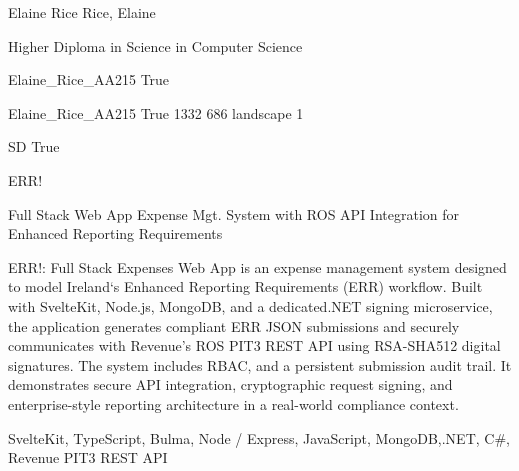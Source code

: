 \documentclass[twoside]{report}
\begin{document}
\begingroup{}\relax



\def\Key{Elaine_Rice_AA215}

{Elaine Rice}
{Rice, Elaine}

{Higher Diploma in Science in Computer Science}

{Elaine_Rice_AA215}
{True}

{Elaine_Rice_AA215}
{True}
{1332}
{686}
{landscape}
{1}

{SD}
{True}

{ERR!}

{Full Stack Web App Expense Mgt. System with ROS API Integration for Enhanced Reporting Requirements}

{ERR!: Full Stack Expenses Web App is an expense management system designed to model Ireland\textquoteleft{}s Enhanced Reporting Requirements (ERR) workflow. Built with SvelteKit, Node.js, MongoDB, and a dedicated.NET signing microservice, the application generates compliant ERR JSON submissions and securely communicates with Revenue\textquoteright{}s ROS PIT3 REST API using RSA-SHA512 digital signatures. The system includes RBAC, and a persistent submission audit trail. It demonstrates secure API integration, cryptographic request signing, and enterprise-style reporting architecture in a real-world compliance context.}

{SvelteKit, TypeScript, Bulma, Node / Express, JavaScript, MongoDB,.NET, C\#, Revenue PIT3 REST API}
\end{document}
